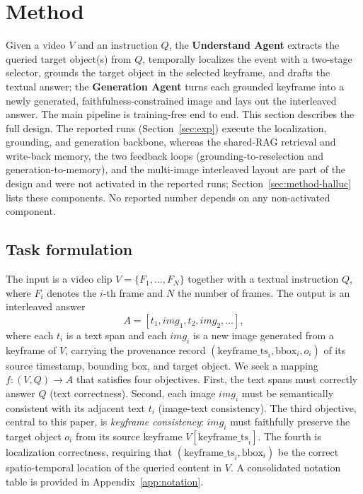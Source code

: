 
\section{Method}\label{sec:method}

Given a video $V$ and an instruction $Q$, the \textbf{Understand Agent} extracts the queried target object(s) from $Q$, temporally localizes the event with a two-stage selector, grounds the target object in the selected keyframe, and drafts the textual answer; the \textbf{Generation Agent} turns each grounded keyframe into a newly generated, faithfulness-constrained image and lays out the interleaved answer. The main pipeline is training-free end to end. This section describes the full design. The reported runs (Section~\ref{sec:exp}) execute the localization, grounding, and generation backbone, whereas the shared-RAG retrieval and write-back memory, the two feedback loops (grounding-to-reselection and generation-to-memory), and the multi-image interleaved layout are part of the design and were not activated in the reported runs; Section~\ref{sec:method-halluc} lists these components. No reported number depends on any non-activated component.

\subsection{Task formulation}\label{sec:method-task}

The input is a video clip $V = \{F_1, \ldots, F_N\}$ together with a textual instruction $Q$, where $F_i$ denotes the $i$-th frame and $N$ the number of frames. The output is an interleaved answer
\begin{equation}
A = [t_1, img_1, t_2, img_2, \ldots],
\end{equation}
where each $t_i$ is a text span and each $img_i$ is a new image generated from a keyframe of $V$, carrying the provenance record $(\text{keyframe\_ts}_i, \text{bbox}_i, o_i)$ of its source timestamp, bounding box, and target object. We seek a mapping $f: (V, Q) \rightarrow A$ that satisfies four objectives. First, the text spans must correctly answer $Q$ (text correctness). Second, each image $img_i$ must be semantically consistent with its adjacent text $t_i$ (image-text consistency). The third objective, central to this paper, is \emph{keyframe consistency}: $img_i$ must faithfully preserve the target object $o_i$ from its source keyframe $V[\text{keyframe\_ts}_i]$. The fourth is localization correctness, requiring that $(\text{keyframe\_ts}_i, \text{bbox}_i)$ be the correct spatio-temporal location of the queried content in $V$. A consolidated notation table is provided in Appendix~\ref{app:notation}.

